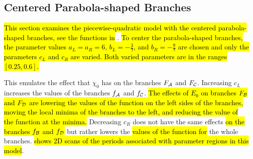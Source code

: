 \subsection{Centered Parabola-shaped Branches}
\label{sec:setup.quad.even}

\hl{This section examines the piecewise-quadratic model with the centered parabola-shaped branches, see the functions in} .
\hl{
	To center the parabola-shaped branches, the parameter values $a_L = a_R = 6$, $b_L = -\frac{3}{2}$, and $b_R = -\frac{9}{2}$ are chosen and only the parameters $c_L$ and $c_R$ are varied.
	Both varied parameters are in the ranges $[0.25, 0.6]$.
}


This emulates the effect that $\chi_0$ has on the branches $F_{\mathcal{A}}$ and $F_{\mathcal{C}}$.
Increasing $c_L$ increases the values of the branches $f_{\mathcal{A}}$ and $f_{\mathcal{C}}$.
\hl{
	The effects of $E_0$ on branches $F_{\mathcal{B}}$ and $F_{\mathcal{D}}$ are lowering the values of the function on the left sides of the branches, moving the local minima of the branches to the left, and reducing the value of the function at the minima.
}
Decreasing $c_R$ does not have the same effects \hl{on the branches $f_{\mathcal{B}}$ and $f_{\mathcal{D}}$} but rather lowers the \hl{values of the function for} the whole branches.
 \hl{shows 2D scans of the periods associated with parameter regions in this model}.

